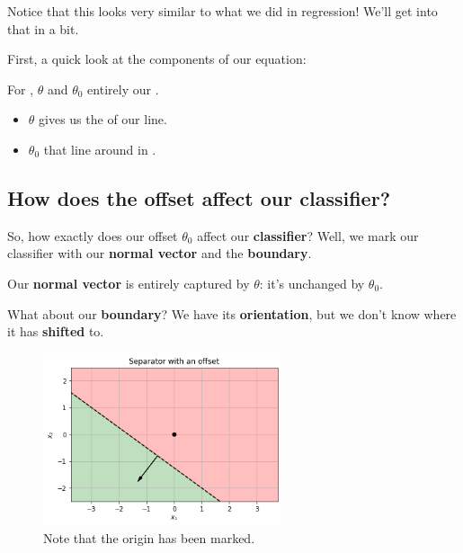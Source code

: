         Notice that this looks very similar to what we did in regression! We'll get into that in a bit.
        
        First, a quick look at the components of our equation:\\
        
        \begin{concept}
            For , $\theta$ and $\theta_0$ entirely  our .
            
            \begin{itemize}
                \item $\theta$ gives us the  of our line.
                \item $\theta_0$  that line around in .
            \end{itemize}
        \end{concept}
    
    \subsection*{How does the offset affect our classifier?}
    
        So, how exactly does our offset $\theta_0$ affect our \textbf{classifier}? Well, we mark our classifier with our \textbf{normal vector} and the \textbf{boundary}.
        
        Our \textbf{normal vector} is entirely captured by $\theta$: it's unchanged by $\theta_0$.
        
        What about our \textbf{boundary}? We have its \textbf{orientation}, but we don't know where it has \textbf{shifted} to.
        
        \begin{figure}[H]
            \centering
                \includegraphics[width=70mm,scale=0.5]{images/classification_images/separator_with_offset.png}
                \caption*{Note that the origin has been marked.}
        \end{figure}
        
